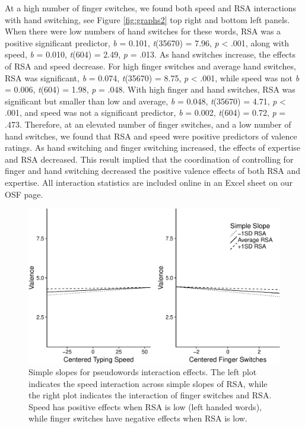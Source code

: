 \documentclass[english,man,man,mask]{apa6}
\theoremstyle{definition}
\theoremstyle{definition}
\theoremstyle{definition}
\theoremstyle{remark}
\begin{document}
At a high number of finger switches, we found both speed and RSA
interactions with hand switching, see Figure \ref{fig:graphs2} top right
and bottom left panels. When there were low numbers of hand switches for
these words, RSA was a positive significant predictor, \emph{b} = 0.101,
\emph{t}(35670) = 7.96, \emph{p} \textless{} .001, along with speed,
\emph{b} = 0.010, \emph{t}(604) = 2.49, \emph{p} = .013. As hand
switches increase, the effects of RSA and speed decrease. For high
finger switches and average hand switches, RSA was significant, \emph{b}
= 0.074, \emph{t}(35670) = 8.75, \emph{p} \textless{} .001, while speed
was not \emph{b} = 0.006, \emph{t}(604) = 1.98, \emph{p} = .048. With
high finger and hand switches, RSA was significant but smaller than low
and average, \emph{b} = 0.048, \emph{t}(35670) = 4.71, \emph{p}
\textless{} .001, and speed was not a significant predictor, \emph{b} =
0.002, \emph{t}(604) = 0.72, \emph{p} = .473. Therefore, at an elevated
number of finger switches, and a low number of hand switches, we found
that RSA and speed were positive predictors of valence ratings. As hand
switching and finger switching increased, the effects of expertise and
RSA decreased. This result implied that the coordination of controlling
for finger and hand switching decreased the positive valence effects of
both RSA and expertise. All interaction statistics are included online
in an Excel sheet on our OSF page.

\begin{figure}
\centering
\includegraphics{QWERTY_bibtest_files/figure-latex/graphs-1.pdf}
\caption{\label{fig:graphs}Simple slopes for pseudowords interaction
effects. The left plot indicates the speed interaction across simple
slopes of RSA, while the right plot indicates the interaction of finger
switches and RSA. Speed has positive effects when RSA is low (left
handed words), while finger switches have negative effects when RSA is
low.}
\end{figure}
\end{document}
